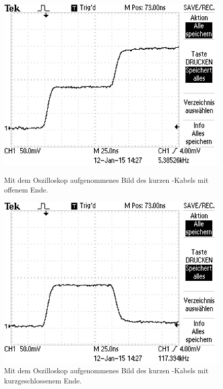 \begin{figure}[ht]
  \centering
  \includegraphics[scale=0.5]{bilder/reflexion/F0002TEK.JPG}
  \caption{Mit dem Oszilloskop aufgenommenes Bild des kurzen \BU-Kabels mit
  offenem Ende.}
  \label{fig:oszi_75k_offen}
  \vspace{2em}
  \includegraphics[scale=0.5]{bilder/reflexion/F0003TEK.JPG}
  \caption{Mit dem Oszilloskop aufgenommenes Bild des kurzen \BU-Kabels mit
  kurzgeschlossenem Ende.}
  \label{fig:oszi_75k_kurz}
\end{figure}
